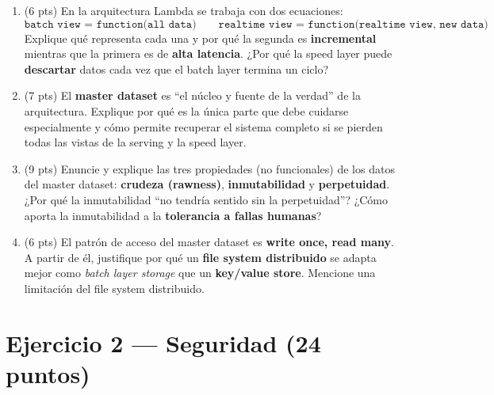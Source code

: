 \documentclass[11pt,a4paper]{article}
\begin{document}
\begin{enumerate}
  \item (6 pts) En la arquitectura Lambda se trabaja con dos ecuaciones:
  \[
    \texttt{batch view = function(all data)} \qquad
    \texttt{realtime view = function(realtime view, new data)}
  \]
  Explique qué representa cada una y por qué la segunda es \textbf{incremental} mientras que la primera es de \textbf{alta latencia}. ¿Por qué la speed layer puede \textbf{descartar} datos cada vez que el batch layer termina un ciclo?

  \vspace{4.5cm}

  \item (7 pts) El \textbf{master dataset} es ``el núcleo y fuente de la verdad'' de la arquitectura. Explique por qué es la única parte que debe cuidarse especialmente y cómo permite recuperar el sistema completo si se pierden todas las vistas de la serving y la speed layer.

  \vspace{4cm}

  \item (9 pts) Enuncie y explique las tres propiedades (no funcionales) de los datos del master dataset: \textbf{crudeza (rawness)}, \textbf{inmutabilidad} y \textbf{perpetuidad}. ¿Por qué la inmutabilidad ``no tendría sentido sin la perpetuidad''? ¿Cómo aporta la inmutabilidad a la \textbf{tolerancia a fallas humanas}?

  \vspace{5.5cm}

  \item (6 pts) El patrón de acceso del master dataset es \textbf{write once, read many}. A partir de él, justifique por qué un \textbf{file system distribuido} se adapta mejor como \textit{batch layer storage} que un \textbf{key/value store}. Mencione una limitación del file system distribuido.

  \vspace{4.5cm}
\end{enumerate}

\newpage

\section*{Ejercicio 2 — Seguridad \hfill\normalfont(24 puntos)}
\end{document}
